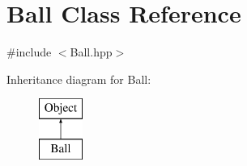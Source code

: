 \hypertarget{class_ball}{}\section{Ball Class Reference}
\label{class_ball}


{\ttfamily \#include $<$Ball.\+hpp$>$}

Inheritance diagram for Ball\+:\begin{figure}[H]
\begin{center}
\leavevmode
\includegraphics[height=2.000000cm]{class_ball}
\end{center}
\end{figure}
